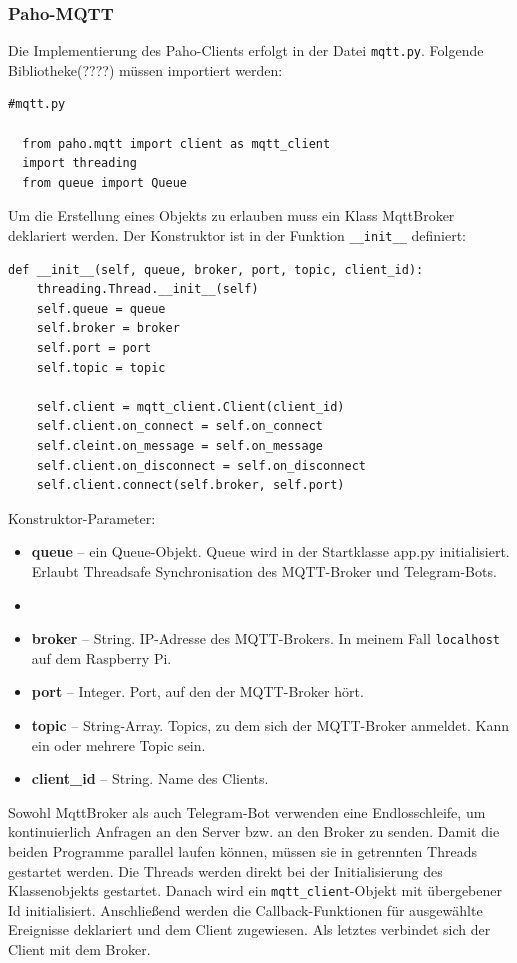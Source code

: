 \documentclass[12pt, letterpaper]{article}
\begin{document}
\subsubsection{Paho-MQTT}
\par Die Implementierung des Paho-Clients erfolgt in der Datei \texttt{mqtt.py}. Folgende Bibliotheke(????) müssen importiert werden:
\begin{Verbatim}[frame=single]
  #mqtt.py

  from paho.mqtt import client as mqtt_client
  import threading
  from queue import Queue
\end{Verbatim}
\par Um die Erstellung eines Objekts zu erlauben muss ein Klass MqttBroker deklariert werden. Der Konstruktor ist in der Funktion \texttt{\_\_init\_\_} definiert:
\begin{Verbatim}[frame=single]
  def __init__(self, queue, broker, port, topic, client_id):
    threading.Thread.__init__(self)
    self.queue = queue
    self.broker = broker
    self.port = port
    self.topic = topic

    self.client = mqtt_client.Client(client_id)
    self.client.on_connect = self.on_connect
    self.cleint.on_message = self.on_message
    self.client.on_disconnect = self.on_disconnect
    self.client.connect(self.broker, self.port)
\end{Verbatim}
\par Konstruktor-Parameter:
\begin{itemize}
  \item[\textbullet] \textbf{queue} -- ein Queue-Objekt. Queue wird in der Startklasse app.py initialisiert. Erlaubt Threadsafe Synchronisation des MQTT-Broker und Telegram-Bots.
  \item[] \item[\textbullet] \textbf{broker} -- String. IP-Adresse des MQTT-Brokers. In meinem Fall \texttt{localhost} auf dem Raspberry Pi.
  \item[\textbullet] \textbf{port} -- Integer. Port, auf den der MQTT-Broker hört.
  \item[\textbullet] \textbf{topic} -- String-Array. Topics, zu dem sich der MQTT-Broker anmeldet. Kann ein oder mehrere Topic sein.
  \item[\textbullet] \textbf{client\_id} -- String. Name des Clients.
\end{itemize}
\par Sowohl MqttBroker als auch Telegram-Bot verwenden eine Endlosschleife, um kontinuierlich Anfragen an den Server bzw. an den Broker zu senden. Damit die beiden Programme parallel laufen können, müssen sie in getrennten Threads gestartet werden. Die Threads werden direkt bei der Initialisierung des Klassenobjekts gestartet. Danach wird ein \texttt{mqtt\_client}-Objekt mit übergebener Id initialisiert. Anschließend werden die Callback-Funktionen für ausgewählte Ereignisse deklariert und dem Client zugewiesen. Als letztes verbindet sich der Client mit dem Broker.
\end{document}
